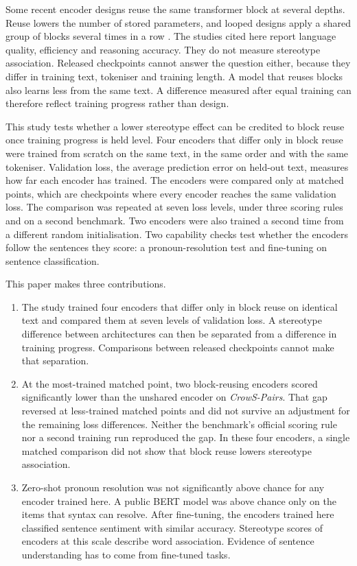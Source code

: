 \documentclass[sigconf,natbib=true]{acmart}
\begin{document}
Some recent encoder designs reuse the same transformer block at several depths.
Reuse lowers the number of stored parameters, and looped designs apply a shared
group of blocks several times in a row
\citep{lan2020albert,saunshi2025looped,zeitoun2026hyperloop}. The studies cited
here report language quality, efficiency and reasoning accuracy. They do not
measure stereotype association. Released checkpoints cannot answer the question
either, because they differ in training text, tokeniser and training length. A
model that reuses blocks also learns less from the same text. A difference
measured after equal training can therefore reflect training progress rather
than design.

This study tests whether a lower stereotype effect can be credited to block
reuse once training progress is held level. Four encoders that differ only in
block reuse were trained from scratch on the same text, in the same order and
with the same tokeniser. Validation loss, the average prediction error on
held-out text, measures how far each encoder has trained. The encoders were
compared only at matched points, which are checkpoints where every encoder
reaches the same validation loss. The comparison was repeated at seven loss
levels, under three scoring rules and on a second benchmark. Two encoders were
also trained a second time from a different random initialisation. Two
capability checks test whether the encoders follow the sentences they score: a
pronoun-resolution test and fine-tuning on sentence classification.

This paper makes three contributions.

\begin{enumerate}
\item The study trained four encoders that differ only in block reuse on
      identical text and compared them at seven levels of validation loss. A
      stereotype difference between architectures can then be separated from
      a difference in training progress. Comparisons between released
      checkpoints cannot make that separation.
\item At the most-trained matched point, two block-reusing encoders scored
      significantly lower than the unshared encoder on \emph{CrowS-Pairs}. That
      gap reversed at less-trained matched points and did not survive an
      adjustment for the remaining loss differences. Neither the benchmark's
      official scoring rule nor a second training run reproduced the gap. In
      these four encoders, a single matched comparison did not show that block
      reuse lowers stereotype association.
\item Zero-shot pronoun resolution was not significantly above chance for any
      encoder trained here. A public BERT model was above chance only on the items that syntax can
      resolve. After fine-tuning, the encoders trained here classified
      sentence sentiment with similar accuracy. Stereotype scores of encoders at
      this scale describe word association. Evidence of sentence understanding
      has to come from fine-tuned tasks.
\end{enumerate}
\end{document}
